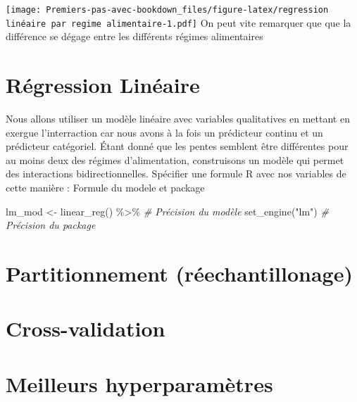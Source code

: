 \documentclass[
]{book}
\newenvironment{Shaded}{\begin{snugshade}}{\end{snugshade}}
\newcommand{\CommentTok}[1]{\textcolor[rgb]{0.56,0.35,0.01}{\textit{#1}}}
\newcommand{\FunctionTok}[1]{\textcolor[rgb]{0.00,0.00,0.00}{#1}}
\newcommand{\NormalTok}[1]{#1}
\newcommand{\OtherTok}[1]{\textcolor[rgb]{0.56,0.35,0.01}{#1}}
\newcommand{\SpecialCharTok}[1]{\textcolor[rgb]{0.00,0.00,0.00}{#1}}
\newcommand{\StringTok}[1]{\textcolor[rgb]{0.31,0.60,0.02}{#1}}
\begin{document}
\texttt{[image: Premiers-pas-avec-bookdown\_files/figure-latex/regression linéaire par regime alimentaire-1.pdf]}
On peut vite remarquer que que la différence se dégage entre les différents régimes alimentaires

\hypertarget{ruxe9gression-linuxe9aire}{%
\chapter{Régression Linéaire}\label{ruxe9gression-linuxe9aire}}

Nous allons utiliser un modèle linéaire avec variables qualitatives en mettant en exergue l'interraction car nous avons à la fois un prédicteur continu et un prédicteur catégoriel. Étant donné que les pentes semblent être différentes pour au moins deux des régimes d'alimentation, construisons un modèle qui permet des interactions bidirectionnelles. Spécifier une formule R avec nos variables de cette manière : Formule du modele et package

\begin{Shaded}
\begin{Highlighting}[]
\NormalTok{lm\_mod }\OtherTok{\textless{}{-}} 
  \FunctionTok{linear\_reg}\NormalTok{() }\SpecialCharTok{\%\textgreater{}\%} \CommentTok{\# Précision du modèle}
  \FunctionTok{set\_engine}\NormalTok{(}\StringTok{"lm"}\NormalTok{) }\CommentTok{\# Précision du package}
\end{Highlighting}
\end{Shaded}

\hypertarget{partitionnement-ruxe9echantillonage}{%
\chapter{Partitionnement (réechantillonage)}\label{partitionnement-ruxe9echantillonage}}

\hypertarget{cross-validation}{%
\chapter{Cross-validation}\label{cross-validation}}

\hypertarget{meilleurs-hyperparamuxe8tres}{%
\chapter{Meilleurs hyperparamètres}\label{meilleurs-hyperparamuxe8tres}}

  
\end{document}
